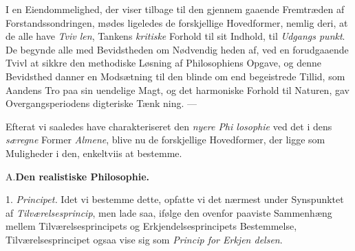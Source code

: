 I en Eiendommelighed, der viser tilbage til den gjennem\-%
gaaende Fremtræden af Forstandssondringen, mødes ligeledes
de forskjellige Hovedformer, nemlig deri, at de alle have \emph{Tviv\-%
len}, Tankens \emph{kritiske} Forhold til sit Indhold, til \emph{Udgangs\-%
punkt}. De begynde alle med Bevidstheden om Nødvendig\-%
heden af, ved en forudgaaende Tvivl at sikkre den methodiske
Løsning af Philosophiens Opgave, og denne Bevidsthed danner
en Modsætning til den blinde om end begeistrede Tillid, som
Aandens Tro paa sin uendelige Magt, og det harmoniske
Forhold til Naturen, gav Overgangsperiodens digteriske Tænk\-%
ning. ---

Efterat vi saaledes have charakteriseret den \emph{nyere Phi\-%
losophie} ved det i dens \emph{særegne} Former \emph{Almene}, blive
nu de forskjellige Hovedformer, der ligge som Muligheder i
den, enkeltviis at bestemme.

\divrule

%
\begin{center}
A.\enspace\textbf{Den realistiske Philosophie.}
\end{center}

1. \emph{Principet.} Idet vi bestemme dette, opfatte vi det
nærmest under Synspunktet af \emph{Tilværelsesprincip}, men
 lade saa, ifølge den ovenfor paaviste Sammenhæng mellem
Tilværelsesprincipets og Erkjendelsesprincipets Bestemmelse,
Tilværelsesprincipet ogsaa vise sig som \emph{Princip for Erkjen\-%
delsen}.

